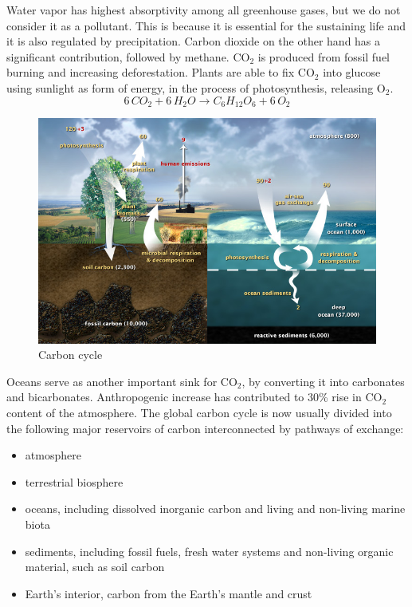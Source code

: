 \documentclass[pdftex,11pt,a4paper]{article}
\begin{document}
Water vapor has highest absorptivity among all greenhouse gases, but we do not consider it as a pollutant. This is because it is essential for the sustaining life and it is also regulated by precipitation. Carbon dioxide on the other hand has a significant contribution, followed by methane. CO$_2$ is produced from fossil fuel burning and increasing deforestation. Plants are able to fix CO$_2$ into glucose using sunlight as form of energy, in the process of photosynthesis, releasing O$_2$.
$$6\,CO_2+6\,H_2O\rightarrow  C_6H_{12}O_6+6\,O_2$$
\begin{figure}[htb]
\includegraphics[clip=true,trim=0pt 0pt 0pt 0pt,scale=0.58]{Carbon_cycle.jpg}
\caption{Carbon cycle}
\end{figure}
Oceans serve as another important sink for CO$_2$, by converting it into carbonates and bicarbonates.
Anthropogenic increase has contributed to 30\% rise in CO$_2$ content of the atmosphere. The global carbon cycle is now usually divided into the following major reservoirs of carbon interconnected by pathways of exchange:
\begin{itemize}
\item atmosphere
\item terrestrial biosphere
\item oceans, including dissolved inorganic carbon and living and non-living marine biota
\item sediments, including fossil fuels, fresh water systems and non-living organic material, such as soil carbon
\item Earth's interior, carbon from the Earth's mantle and crust
\end{itemize} 
\end{document}
